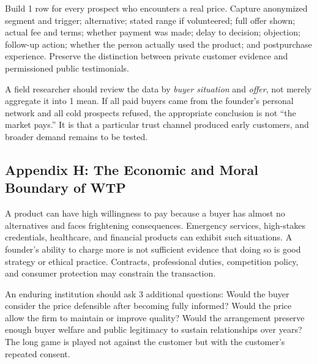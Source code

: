 Build 1 row for every prospect who encounters a real price. Capture anonymized segment and trigger; alternative; stated range if volunteered; full offer shown; actual fee and terms; whether payment was made; delay to decision; objection; follow-up action; whether the person actually used the product; and postpurchase experience. Preserve the distinction between private customer evidence and permissioned public testimonials.

A field researcher should review the data by \emph{buyer situation} and \emph{offer}, not merely aggregate it into 1 mean. If all paid buyers came from the founder's personal network and all cold prospects refused, the appropriate conclusion is not ``the market pays.'' It is that a particular trust channel produced early customers, and broader demand remains to be tested.

\subsection*{Appendix H: The Economic and Moral Boundary of WTP}

A product can have high willingness to pay because a buyer has almost no alternatives and faces frightening consequences. Emergency services, high-stakes credentials, healthcare, and financial products can exhibit such situations. A founder's ability to charge more is not sufficient evidence that doing so is good strategy or ethical practice. Contracts, professional duties, competition policy, and consumer protection may constrain the transaction.

An enduring institution should ask 3 additional questions: Would the buyer consider the price defensible after becoming fully informed? Would the price allow the firm to maintain or improve quality? Would the arrangement preserve enough buyer welfare and public legitimacy to sustain relationships over years? The long game is played not against the customer but with the customer's repeated consent.
